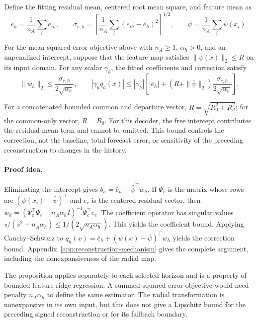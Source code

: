 Define the fitting residual mean, centered root mean square, and feature
mean as
\[
 \bar e_h=\frac1{n_A}\sum_i e_{ih},\qquad
 \sigma_{e,h}=\left[\frac1{n_A}\sum_i(e_{ih}-\bar e_h)^2\right]^{1/2},
 \qquad
 \bar\psi=\frac1{n_A}\sum_i\psi(x_i).
\]
\begin{proposition}
\label{prop:mechanism-correction-bound}
For the mean-squared-error objective above with $n_A\geq1$,
$\alpha_h>0$, and an unpenalized intercept, suppose that the feature
map satisfies $\|\psi(x)\|_2\leq R$ on its input domain.
For any scalar $\gamma_h$, the fitted coefficients and correction satisfy
\begin{equation}
 \|w_h\|_2\le\frac{\sigma_{e,h}}{2\sqrt{\alpha_h}},\qquad
 |\gamma_h q_h(x)|\le |\gamma_h|\left[
 |\bar e_h|+(R+\|\bar\psi\|_2)
 \frac{\sigma_{e,h}}{2\sqrt{\alpha_h}}\right].
 \label{eq:mechanism-main-correction-bound}
\end{equation}
\end{proposition}
For a concatenated bounded common and departure vector,
$R=\sqrt{R_0^2+R_d^2}$; for the common-only vector, $R=R_0$.
For this decoder, the free intercept contributes the residual-mean term
and cannot be omitted. This bound controls the correction, not the baseline, total
forecast error, or sensitivity of the preceding reconstruction to changes
in the history.


\paragraph{Proof idea.}
Eliminating the intercept gives
$b_h=\bar e_h-\bar\psi^\top w_h$. If $\Psi_c$ is the matrix whose
rows are $(\psi(x_i)-\bar\psi)^\top$ and $e_c$ is the centered
residual vector, then
$w_h=(\Psi_c^\top\Psi_c+n_A\alpha_h I)^{-1}\Psi_c^\top e_c$.
The coefficient operator has singular values
$s/(s^2+n_A\alpha_h)\leq1/(2\sqrt{n_A\alpha_h})$.
This yields the coefficient bound. Applying Cauchy--Schwarz to
$q_h(x)=\bar e_h+(\psi(x)-\bar\psi)^\top w_h$ yields the
correction bound. Appendix~\ref{app:reconstruction-mechanism} gives
the complete argument, including the nonexpansiveness of the radial map.

The proposition applies separately to each selected horizon and is a property
of bounded-feature ridge regression. A summed-squared-error objective
would need penalty $n_A\alpha_h$ to define the same estimator. The
radial transformation is nonexpansive in its own input, but this does
not give a Lipschitz bound for the preceding signed reconstruction or
for its fallback boundary.

